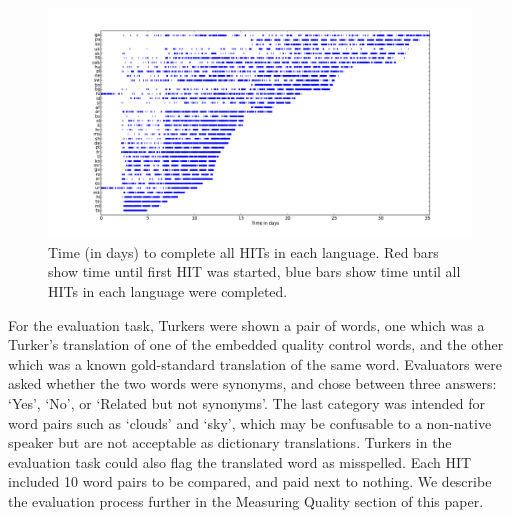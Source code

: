 \documentclass[11pt]{article}
\begin{document}
\begin{figure}[h]
\centering
\includegraphics[height=\linewidth,angle=270]{figures/completiontime}
\caption{Time (in days) to complete all HITs in each language. Red bars show time until first HIT was started,
 blue bars show time until all HITs in each language were completed.}
\label{completion-time}
\end{figure}


For the evaluation task, Turkers were shown a pair of words, one which was a Turker's translation of one of the embedded quality control words, and the other which was a known gold-standard translation of the same word. Evaluators were asked whether the two words were synonyms, and chose between three answers: `Yes', `No', or `Related but not synonyms'. The last category was intended for word pairs such as `clouds' and `sky', which may be confusable to a non-native speaker but are not acceptable as dictionary translations. Turkers in the evaluation task could also flag the translated word as misspelled. Each HIT included 10 word pairs to be compared, and paid next to nothing. We describe the evaluation process further in the Measuring Quality section of this paper.
\end{document}
